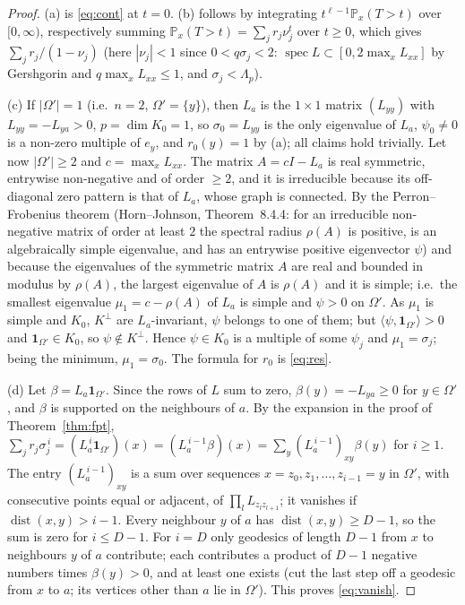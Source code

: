 \documentclass[11pt,a4paper]{article}
\DeclareMathOperator{\spec}{spec}
\DeclareMathOperator{\dist}{dist}
\newcommand{\one}{\mathbf 1}
\newcommand{\PP}{\mathbb P}
\newcommand{\ip}[2]{\langle #1,#2\rangle}
\theoremstyle{plain}
\theoremstyle{definition}
\numberwithin{equation}{section}
\begin{document}
\begin{proof}
(a) is \eqref{eq:cont} at $t=0$. (b) follows by integrating $t^{\ell-1}\PP_x(T>t)$ over $[0,\infty)$, respectively summing $\PP_x(T>t)=\sum_jr_j\nu_j^t$ over $t\ge0$, which gives $\sum_jr_j/(1-\nu_j)$ (here $|\nu_j|<1$ since $0<q\sigma_j<2$: $\spec L\subset[0,2\max_xL_{xx}]$ by Gershgorin and $q\max_x L_{xx}\le1$, and $\sigma_j<\Lambda_p$).

(c) If $|\Omega'|=1$ (i.e.\ $n=2$, $\Omega'=\{y\}$), then $L_a$ is the $1\times1$ matrix $(L_{yy})$ with $L_{yy}=-L_{ya}>0$, $p=\dim K_0=1$, so $\sigma_0=L_{yy}$ is the only eigenvalue of $L_a$, $\psi_0\ne0$ is a non-zero multiple of $e_y$, and $r_0(y)=1$ by (a); all claims hold trivially. Let now $|\Omega'|\ge2$ and $c=\max_xL_{xx}$. The matrix $A=cI-L_a$ is real symmetric, entrywise non-negative and of order $\ge2$, and it is irreducible because its off-diagonal zero pattern is that of $L_a$, whose graph is connected. By the Perron--Frobenius theorem (Horn--Johnson, Theorem~8.4.4: for an irreducible non-negative matrix of order at least $2$ the spectral radius $\rho(A)$ is positive, is an algebraically simple eigenvalue, and has an entrywise positive eigenvector $\psi$) and because the eigenvalues of the symmetric matrix $A$ are real and bounded in modulus by $\rho(A)$, the largest eigenvalue of $A$ is $\rho(A)$ and it is simple; i.e.\ the smallest eigenvalue $\mu_1=c-\rho(A)$ of $L_a$ is simple and $\psi>0$ on $\Omega'$. As $\mu_1$ is simple and $K_0$, $K^\perp$ are $L_a$-invariant, $\psi$ belongs to one of them; but $\ip\psi{\one_{\Omega'}}>0$ and $\one_{\Omega'}\in K_0$, so $\psi\notin K^\perp$. Hence $\psi\in K_0$ is a multiple of some $\psi_j$ and $\mu_1=\sigma_j$; being the minimum, $\mu_1=\sigma_0$. The formula for $r_0$ is \eqref{eq:res}.

(d) Let $\beta=L_a\one_{\Omega'}$. Since the rows of $L$ sum to zero, $\beta(y)=-L_{ya}\ge0$ for $y\in\Omega'$, and $\beta$ is supported on the neighbours of $a$. By the expansion in the proof of Theorem~\ref{thm:fpt}, $\sum_jr_j\sigma_j^{\,i}=(L_a^{\,i}\one_{\Omega'})(x)=(L_a^{\,i-1}\beta)(x)=\sum_y(L_a^{\,i-1})_{xy}\beta(y)$ for $i\ge1$. The entry $(L_a^{\,i-1})_{xy}$ is a sum over sequences $x=z_0,z_1,\dots,z_{i-1}=y$ in $\Omega'$, with consecutive points equal or adjacent, of $\prod_lL_{z_lz_{l+1}}$; it vanishes if $\dist(x,y)>i-1$. Every neighbour $y$ of $a$ has $\dist(x,y)\ge D-1$, so the sum is zero for $i\le D-1$. For $i=D$ only geodesics of length $D-1$ from $x$ to neighbours $y$ of $a$ contribute; each contributes a product of $D-1$ negative numbers times $\beta(y)>0$, and at least one exists (cut the last step off a geodesic from $x$ to $a$; its vertices other than $a$ lie in $\Omega'$). This proves \eqref{eq:vanish}.


\end{proof}
\end{document}
